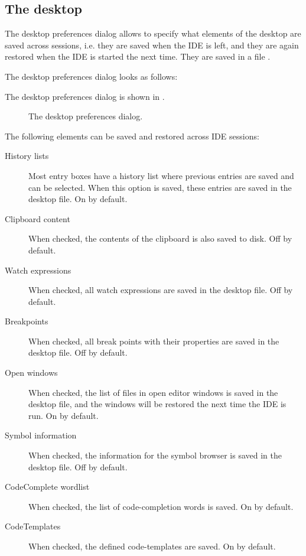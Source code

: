 \subsection{The desktop}
\label{se:prefdesktop}
The desktop preferences dialog allows to specify what elements of the
desktop are saved across sessions, i.e. they are saved when the IDE is left,
and they are again restored when the IDE is started the next time. 
They are saved in a file .

\begin{htmlonly}
The desktop preferences dialog looks as follows:
\end{htmlonly}
\begin{latexonly}
The desktop preferences dialog is shown in .
\begin{figure}[ht]
\begin{center}
\caption{The desktop preferences dialog.}\label{fig:odesktop}
\ifpdf
{}%
\else
{}
\fi
\end{center}
\end{figure}
\end{latexonly}
The following elements can be saved and restored across IDE sessions:
\begin{description}
\item[History lists] Most entry boxes have a history list where previous
entries are saved and can be selected. When this option is saved, these
entries are saved in the desktop file. On by default.
\item[Clipboard content]
When checked, the contents of the clipboard is also saved to disk. Off by
default.
\item[Watch expressions]
When checked, all watch expressions are saved in the desktop file. Off by
default.
\item[Breakpoints] 
When checked, all break points with their properties are saved in the
desktop file. Off by default.
\item[Open windows]
When checked, the list of files in open editor windows is saved in the 
desktop file, and the windows will be restored the next time the IDE 
is run. On by default.
\item[Symbol information]
When checked, the information for the symbol browser is saved in the desktop
file. Off by default.
\item[CodeComplete wordlist]
When checked, the list of code-completion words is saved. On by default.
\item[CodeTemplates]
When checked, the defined code-templates are saved. On by default.
\end{description}

